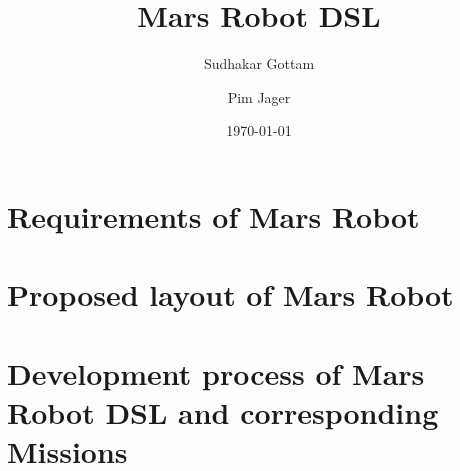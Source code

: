 \documentclass[titlepage]{article}
\author{%
	Sudhakar Gottam\and
	Pim Jager
}
\title{Mars Robot DSL}
\date{\today}
\begin{document}
\maketitle
\tableofcontents
\newpage

\section{Requirements of Mars Robot}


\section{Proposed layout of Mars Robot}


\section{Development process of Mars Robot DSL and corresponding Missions}

\end{document}
